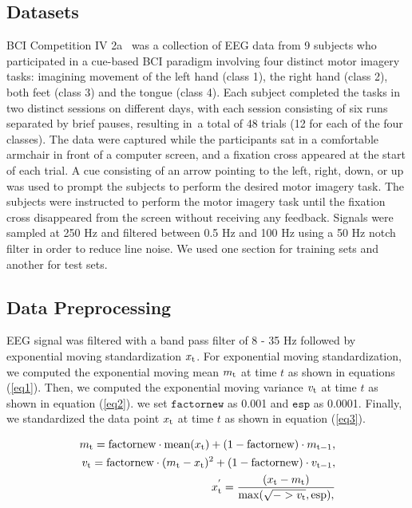 \documentclass[runningheads]{llncs}
\begin{document}
\subsection{Datasets}

BCI Competition IV 2a \cite{brunner2008bci} was a collection of EEG data from 9 subjects who participated in a cue-based BCI paradigm involving four distinct motor imagery tasks: imagining movement of the left hand (class 1), the right hand (class 2), both feet (class 3) and the tongue (class 4). Each subject completed the tasks in two distinct sessions on different days, with each session consisting of six runs separated by brief pauses, resulting in a total of 48 trials (12 for each of the four classes). The data were captured while the participants sat in a comfortable armchair in front of a computer screen, and a fixation cross appeared at the start of each trial. A cue consisting of an arrow pointing to the left, right, down, or up was used to prompt the subjects to perform the desired motor imagery task. The subjects were instructed to perform the motor imagery task until the fixation cross disappeared from the screen without receiving any feedback. Signals were sampled at 250 Hz and filtered between 0.5 Hz and 100 Hz using a 50 Hz notch filter in order to reduce line noise. We used one section for training sets and another for test sets.

\subsection{Data Preprocessing}
EEG signal was filtered with a band pass filter of 8 - 35 Hz followed by exponential moving standardization $x_{\rm t}$. For exponential moving standardization, we computed the exponential moving mean $m_{\rm t}$ at time $t$ as shown in equations (\ref{eq1}).
Then, we computed the exponential moving variance $v_{\rm t}$ at time $t$ as shown in equation (\ref{eq2}).
we set $\texttt{factornew}$ as 0.001 and $\texttt{esp}$ as 0.0001. Finally, we standardized the data point $x_{\rm t}$ at time $t$ as shown in equation (\ref{eq3}).

\begin{eqnarray} 
m_{\rm t} = \text{factornew} \cdot \text{mean}(x_{\rm t}) + (1 - \text{factornew}) \cdot m_{\rm t-1}, \label{eq1}\\
v_{\rm t} = \text{factornew}\cdot (m_{\rm t} - x_{\rm t})^{2} + (1 - \text{factornew}) \cdot v_{\rm t-1} , \label{eq2} \\ 
x_{\rm t}^{'}  = \frac{(x_{\rm t}-m_{\rm t})}{\text{max}(\sqrt{->v_{\rm t}},\text{esp}), \label{eq3} }
\end{eqnarray}
\end{document}
